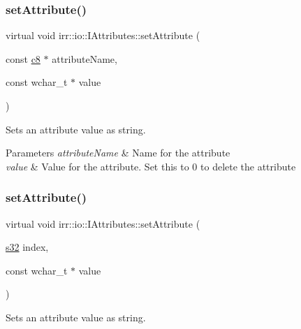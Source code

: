 \subsubsection{\texorpdfstring{set\+Attribute()}{setAttribute()}\hspace{0.1cm}{\footnotesize\ttfamily [6/10]}}
{\footnotesize\ttfamily virtual void irr\+::io\+::\+I\+Attributes\+::set\+Attribute (\begin{DoxyParamCaption}\item[{const \hyperlink{namespaceirr_a9395eaea339bcb546b319e9c96bf7410}{c8} $\ast$}]{attribute\+Name,  }\item[{const wchar\+\_\+t $\ast$}]{value }\end{DoxyParamCaption})\hspace{0.3cm}{\ttfamily [pure virtual]}}



Sets an attribute value as string. 


\begin{DoxyParams}{Parameters}
{\em attribute\+Name} & Name for the attribute \\
\hline
{\em value} & Value for the attribute. Set this to 0 to delete the attribute \\
\hline
\end{DoxyParams}
\mbox{\label{classirr_1_1io_1_1IAttributes_a679ae0badc391b6814db9cd7cf3d45bc}} 
\subsubsection{\texorpdfstring{set\+Attribute()}{setAttribute()}\hspace{0.1cm}{\footnotesize\ttfamily [7/10]}}
{\footnotesize\ttfamily virtual void irr\+::io\+::\+I\+Attributes\+::set\+Attribute (\begin{DoxyParamCaption}\item[{\hyperlink{namespaceirr_ac66849b7a6ed16e30ebede579f9b47c6}{s32}}]{index,  }\item[{const wchar\+\_\+t $\ast$}]{value }\end{DoxyParamCaption})\hspace{0.3cm}{\ttfamily [pure virtual]}}



Sets an attribute value as string. 


